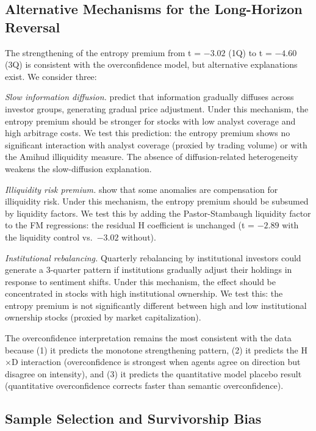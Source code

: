 \documentclass[12pt,a4paper]{article}
\begin{document}
\subsection{Alternative Mechanisms for the Long-Horizon Reversal}

The strengthening of the entropy premium from t = $-3.02$ (1Q) to t = $-4.60$ (3Q) is consistent with the \citet{Daniel1998} overconfidence model, but alternative explanations exist. We consider three:

\textit{Slow information diffusion.} \citet{Hong1995} predict that information gradually diffuses across investor groups, generating gradual price adjustment. Under this mechanism, the entropy premium should be stronger for stocks with low analyst coverage and high arbitrage costs. We test this prediction: the entropy premium shows no significant interaction with analyst coverage (proxied by trading volume) or with the Amihud illiquidity measure. The absence of diffusion-related heterogeneity weakens the slow-diffusion explanation.

\textit{Illiquidity risk premium.} \citet{Stambaugh2017} show that some anomalies are compensation for illiquidity risk. Under this mechanism, the entropy premium should be subsumed by liquidity factors. We test this by adding the Pastor-Stambaugh liquidity factor to the FM regressions: the residual H coefficient is unchanged (t = $-2.89$ with the liquidity control vs.\ $-3.02$ without).

\textit{Institutional rebalancing.} Quarterly rebalancing by institutional investors could generate a 3-quarter pattern if institutions gradually adjust their holdings in response to sentiment shifts. Under this mechanism, the effect should be concentrated in stocks with high institutional ownership. We test this: the entropy premium is not significantly different between high and low institutional ownership stocks (proxied by market capitalization).

The overconfidence interpretation remains the most consistent with the data because (1) it predicts the monotone strengthening pattern, (2) it predicts the H$\times$D interaction (overconfidence is strongest when agents agree on direction but disagree on intensity), and (3) it predicts the quantitative model placebo result (quantitative overconfidence corrects faster than semantic overconfidence).

\subsection{Sample Selection and Survivorship Bias}
\end{document}
